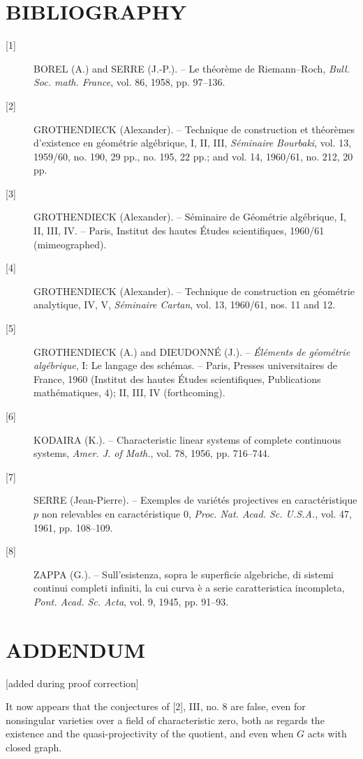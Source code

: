 \section*{BIBLIOGRAPHY}

\begin{description}
\item[{[1]}] BOREL (A.) and SERRE (J.-P.). -- Le théorème de Riemann--Roch,
\emph{Bull. Soc. math. France}, vol. 86, 1958, pp. 97--136.

\item[{[2]}] GROTHENDIECK (Alexander). -- Technique de construction et
théorèmes d'existence en géométrie algébrique, I, II, III, \emph{Séminaire
Bourbaki}, vol. 13, 1959/60, no. 190, 29 pp., no. 195, 22 pp.; and vol. 14,
1960/61, no. 212, 20 pp.

\item[{[3]}] GROTHENDIECK (Alexander). -- Séminaire de Géométrie algébrique,
I, II, III, IV. -- Paris, Institut des hautes Études scientifiques, 1960/61
(mimeographed).

\item[{[4]}] GROTHENDIECK (Alexander). -- Technique de construction en
géométrie analytique, IV, V, \emph{Séminaire Cartan}, vol. 13, 1960/61, nos. 11
and 12.

\item[{[5]}] GROTHENDIECK (A.) and DIEUDONNÉ (J.). -- \emph{Éléments de
géométrie algébrique}, I: Le langage des schémas. -- Paris, Presses
universitaires de France, 1960 (Institut des hautes Études scientifiques,
Publications mathématiques, 4); II, III, IV (forthcoming).

\item[{[6]}] KODAIRA (K.). -- Characteristic linear systems of complete
continuous systems, \emph{Amer. J. of Math.}, vol. 78, 1956, pp. 716--744.

\item[{[7]}] SERRE (Jean-Pierre). -- Exemples de variétés projectives en
caractéristique $p$ non relevables en caractéristique 0, \emph{Proc. Nat. Acad.
Sc. U.S.A.}, vol. 47, 1961, pp. 108--109.

\item[{[8]}] ZAPPA (G.). -- Sull'esistenza, sopra le superficie algebriche, di
sistemi continui completi infiniti, la cui curva è a serie caratteristica
incompleta, \emph{Pont. Acad. Sc. Acta}, vol. 9, 1945, pp. 91--93.
\end{description}

\section*{ADDENDUM}
\begin{center}
{\small [added during proof correction]}
\end{center}

It now appears that the conjectures of [2], III, no. 8 are false, even for
nonsingular varieties over a field of characteristic zero, both as regards the
existence and the quasi-projectivity of the quotient, and even when $G$ acts
with closed graph.

\par\smallskip
\begingroup\footnotesize
\endgroup
